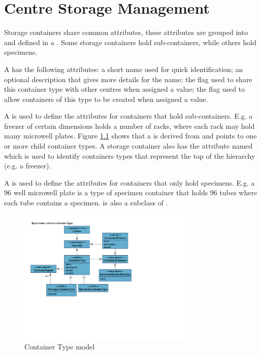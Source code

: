 \chapter{Centre Storage Management}
\label{chap:centre-storage-management}
Storage containers share common attributes, these attributes are grouped into
and defined in a . Some storage containers hold
sub-containers, while others hold specimens.

A  has the following attributes: a short name used
for quick identification; an optional description that gives more details for
the name; the  flag used to share this container type with
other centres when assigned a  value; the 
flag used to allow containers of this type to be created when assigned a
 value.

A  is used to define the attributes for
containers that hold sub-containers. E.g. a freezer of certain dimensions holds
a number of racks, where each rack may hold many microwell plates. Figure
\ref{fig:centre-container-type} shows that a 
is derived from  and points to one or more child
container types. A storage container also has the attribute named
 which is used to identify containers types that represent
the top of the hierarchy (e.g. a freezer).

A  is used to define the attributes for
containers that only hold specimens. E.g. a 96 well microwell plate is a type
of specimen container that holds 96 tubes where each tube contains a specimen.
 is also a subclass of
.

\begin{figure}[H]
  \centering
  \includegraphics[trim={10mm 73mm 92mm 18mm}, clip,
    width=0.75\textwidth]{images/centre-container-type}
  \caption{Container Type model}
  \label{fig:centre-container-type}
\end{figure}

